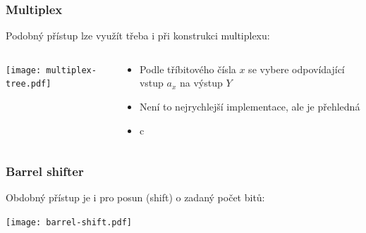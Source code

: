 \documentclass{beamer}
\begin{document}
\begin{frame}
\frametitle{Multiplex}

Podobný přístup lze využít třeba i při konstrukci multiplexu:
\begin{columns}
\begin{column}{0.5\textwidth}
\begin{center}
   \texttt{[image: multiplex-tree.pdf]}
\end{center}
\end{column}
\begin{column}{0.5\textwidth}
\begin{itemize}
\item Podle tříbitového čísla $x$ se vybere odpovídající vstup $a_x$ na výstup $Y$
\item Není to nejrychlejší implementace, ale je přehledná
\item c
\end{itemize}

\end{column}
\end{columns}

\end{frame}


\begin{frame}
\frametitle{Barrel shifter}

Obdobný přístup je i pro posun (shift) o zadaný počet bitů:
\begin{center}
   \texttt{[image: barrel-shift.pdf]}
\end{center}


\end{frame}
\end{document}
